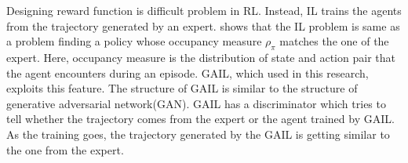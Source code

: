 Designing reward function is difficult problem in RL. Instead, IL trains the agents from the trajectory generated by an expert. \cite{Ho} shows that the IL problem is same as a problem finding a policy whose occupancy measure $\rho_\pi$ matches the one of the expert. Here, occupancy measure is the distribution of state and action pair that the agent encounters during an episode. GAIL, which used in this research, exploits this feature. The structure of GAIL is similar to the structure of generative adversarial network(GAN)\cite{Goodfellow2014}. GAIL has a discriminator which tries to tell whether the trajectory comes from the expert or the agent trained by GAIL. As the training goes, the trajectory generated by the GAIL is getting similar to the one from the expert.